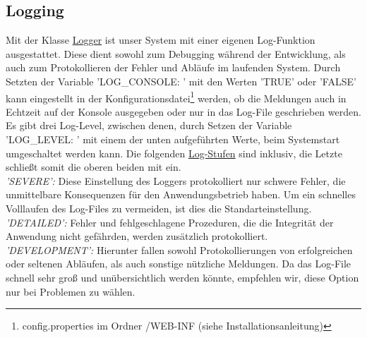 \documentclass{article}
\begin{document}
\subsection{Logging}
Mit der Klasse \hyperlink{Logger}{Logger} ist unser System mit einer eigenen Log-Funktion ausgestattet. Diese dient sowohl zum Debugging während der Entwicklung, als auch zum Protokollieren der Fehler und Abläufe im laufenden System. Durch Setzten der Variable 'LOG\_CONSOLE: ' mit den Werten 'TRUE' oder 'FALSE' kann eingestellt in der Konfigurationsdatei\footnote{config.properties im Ordner /WEB-INF (siehe Installationsanleitung)} werden, ob die Meldungen auch in Echtzeit auf der Konsole ausgegeben oder nur in das Log-File geschrieben werden. Es gibt drei Log-Level, zwischen denen, durch Setzen der Variable 'LOG\_LEVEL: ' mit einem der unten aufgeführten Werte, beim Systemstart umgeschaltet werden kann. Die folgenden \hyperlink{Logger}{Log-Stufen} sind inklusiv, die Letzte schließt somit die oberen beiden mit ein. \\
\textit{'SEVERE':} Diese Einstellung des Loggers protokolliert nur schwere Fehler, die unmittelbare Konsequenzen für den Anwendungsbetrieb haben. Um ein schnelles Volllaufen des Log-Files zu vermeiden, ist dies die Standarteinstellung.\\
\textit{'DETAILED':} Fehler und fehlgeschlagene Prozeduren, die die Integrität der Anwendung nicht gefährden, werden zusätzlich protokolliert.\\
\textit{'DEVELOPMENT':} Hierunter fallen sowohl Protokollierungen von erfolgreichen oder seltenen Abläufen, als auch sonstige nützliche Meldungen. Da das Log-File schnell sehr groß und unübersichtlich werden könnte, empfehlen wir, diese Option nur bei Problemen zu wählen.\\
\end{document}
